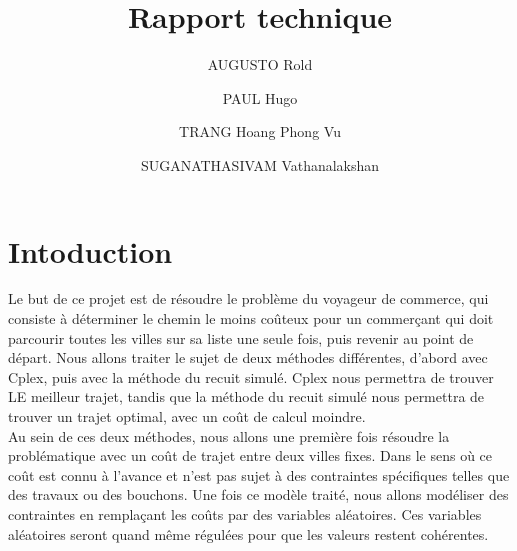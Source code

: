 \documentclass{article}
\title{Rapport technique}
\author{
	AUGUSTO Rold 
	\and 
	PAUL Hugo 
	\and 
	TRANG Hoang Phong Vu
	\and 
	SUGANATHASIVAM Vathanalakshan
	}
\begin{document}
\maketitle
\section{Intoduction}
Le but de ce projet est de résoudre le problème du voyageur de commerce, qui consiste à déterminer le chemin le moins coûteux pour un commerçant qui doit parcourir toutes les villes sur sa liste une seule fois, puis revenir au point de départ. Nous allons traiter le sujet de deux méthodes différentes, d’abord avec Cplex, puis avec la méthode du recuit simulé. Cplex nous permettra de trouver LE meilleur trajet, tandis que la méthode du recuit simulé nous permettra de trouver un trajet optimal, avec un coût de calcul moindre.\\
Au sein de ces deux méthodes, nous allons une première fois résoudre la problématique avec un coût de trajet entre deux villes fixes. Dans le sens où ce coût est connu à l’avance et n’est pas sujet à des contraintes spécifiques telles que des travaux ou des bouchons. Une fois ce modèle traité, nous allons modéliser des contraintes en remplaçant les coûts par des variables aléatoires. Ces variables aléatoires seront quand même régulées pour que les valeurs restent cohérentes. 
\end{document}
